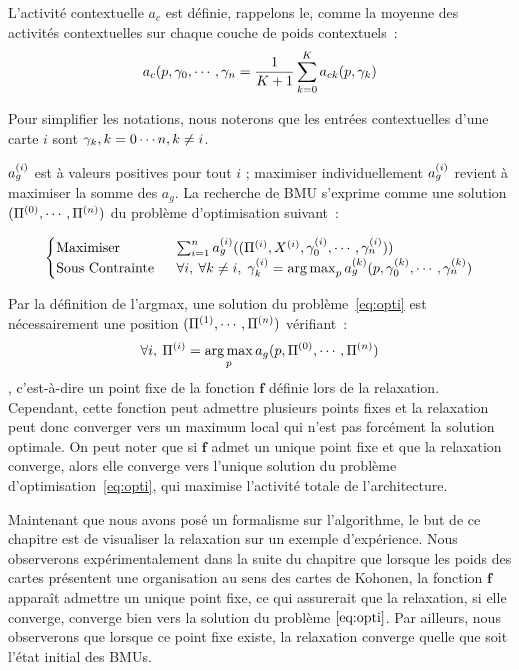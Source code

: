 \documentclass[../main]{subfiles}
\begin{document}
L'activité contextuelle $a_c$ est définie, rappelons le, comme la moyenne des activités contextuelles sur chaque couche de poids contextuels~:
\begin{equation}
	a_c(p, \gamma_0, \cdots, \gamma_n = \frac{1}{K+1}\sum_{k=0}^{K}{a_{ck}(p, \gamma_k)}
\end{equation}

Pour simplifier les notations, nous noterons que les entrées contextuelles d'une carte $i$ sont ${\gamma_k, k = 0 \cdots n , k \neq i}$.

$a_g^{({i})}$ est à valeurs positives pour tout $i$ ; maximiser individuellement $a_g^{({i})}$ revient à maximiser la somme des $a_g$. 
La recherche de BMU s'exprime comme une solution $(\Pi^{({0})}, \cdots, \Pi^{({n})})$ du problème d'optimisation suivant~:

\begin{equation}\label{eq:opti}
	\begin{cases}
	\text{Maximiser}\;& \sum_{i = 1}^n a_g^{({i})}((\Pi^{({i})},X^{({i})},\gamma_0^{({i})}, \cdots, \gamma_n^{({i})})) \\
	\text{Sous Contrainte }\; &\forall i,\:\forall k \neq i, \; \gamma_k^{({i})} = \operatorname*{arg\,max}_{p}a_g^{({k})}(p,\gamma_0^{({k})}, \cdots, \gamma_n^{({k})})
	\end{cases}
\end{equation}

Par la définition de l'argmax, une solution du problème~\ref{eq:opti} est nécessairement une position $(\Pi^{({1})}, \cdots, \Pi^{({n})})$ vérifiant~:
$$\forall i, \: \Pi^{({i})} = \operatorname*{arg\,max}_p a_g(p, \Pi^{({0})}, \cdots, \Pi^{({n})})$$, c'est-à-dire un point fixe de la fonction $\mathbf{f}$ définie lors de la relaxation.
Cependant, cette fonction peut admettre plusieurs points fixes et la relaxation peut donc converger vers un maximum local qui n'est pas forcément la solution optimale.
On peut noter que si $\mathbf{f}$ admet un unique point fixe et que la relaxation converge, alors elle converge vers l'unique solution du problème d'optimisation~\ref{eq:opti}, qui maximise l'activité totale de l'architecture.

Maintenant que nous avons posé un formalisme sur l'algorithme, le but de ce chapitre est de visualiser la relaxation sur un exemple d'expérience.
Nous observerons expérimentalement dans la suite du chapitre que lorsque les poids des cartes présentent une organisation au sens des cartes de Kohonen, la fonction $\mathbf{f}$ apparaît admettre un unique point fixe, ce qui assurerait que la relaxation, si elle converge, converge bien vers la solution du problème $\ref{eq:opti}$. Par ailleurs, nous observerons que lorsque ce point fixe existe, la relaxation converge quelle que soit l'état initial des BMUs.
\end{document}
